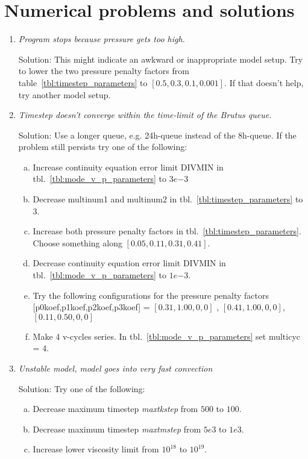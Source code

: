 
\section{Numerical problems and solutions}

\begin{enumerate}[-]
\item \textit{Program stops because pressure gets too high.}

Solution: This might indicate an awkward or inappropriate model setup. Try to lower the two pressure penalty factors from table~\ref{tbl:timestep_parameters} to $[0.5,0.3,0.1,0.001]$. If that doesn't help, try another model setup.
\item \textit{Timestep doesn't converge within the time-limit of the Brutus queue.}

Solution: Use a longer queue, e.g. 24h-queue instead of the 8h-queue. If the problem still persists try one of the following:
\begin{enumerate}[a)]
\item Increase continuity equation error limit DIVMIN in tbl.~\ref{tbl:mode_v_p_parameters} to $3e{-3}$
\item Decrease multinum1 and multinum2 in tbl.~\ref{tbl:timestep_parameters} to $3$.
\item Increase both pressure penalty factors in tbl.~\ref{tbl:timestep_parameters}. Choose something along $[0.05,0.11,0.31,0.41]$.
\item Decrease continuity equation error limit DIVMIN in tbl.~\ref{tbl:mode_v_p_parameters} to $1e{-3}$.
\item Try the following configurations for the pressure penalty factors [p0koef,p1koef,p2koef,p3koef] = $[0.31,1.00,0,0]$ , $[0.41,1.00,0,0]$, $[0.11,0.50,0,0]$
\item Make 4 v-cycles series. In tbl.~\ref{tbl:mode_v_p_parameters} set multicyc = $4$.
\end{enumerate}
\item \textit{Unstable model, model goes into very fast convection}

Solution: Try one of the following:
\begin{enumerate}[a)]
\item Decrease maximum timestep \textit{maxtkstep} from $500$ to $100$.
\item Decrease maximum timestep \textit{maxtmstep} from $5e3$ to $1e3$.
\item Increase lower viscosity limit from $10^{18}$ to $10^{19}$.
\end{enumerate}
\end{enumerate}